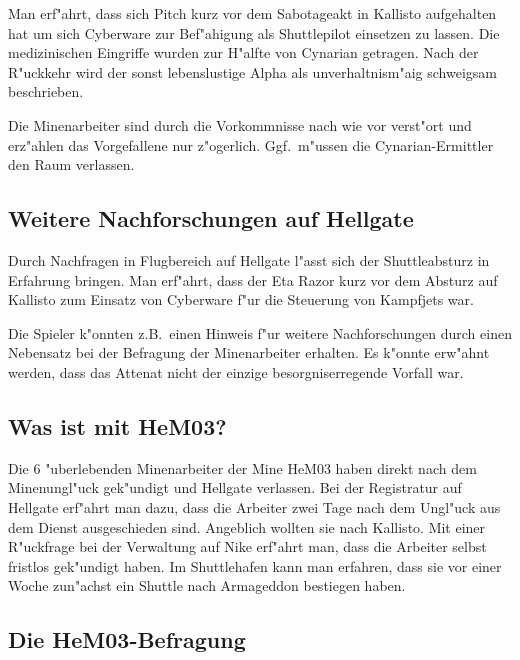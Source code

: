 Man erf"ahrt, dass sich Pitch kurz vor dem Sabotageakt in Kallisto aufgehalten hat um sich Cyberware zur Bef"ahigung als Shuttlepilot einsetzen zu lassen. Die medizinischen Eingriffe wurden zur H"alfte von Cynarian getragen. Nach der R"uckkehr wird der sonst lebenslustige Alpha als unverhaltnism"a\3ig schweigsam beschrieben.

\begin{remarks}
Die Minenarbeiter sind durch die Vorkommnisse nach wie vor verst"ort und erz"ahlen das Vorgefallene nur z"ogerlich. Ggf.~m"ussen die Cynarian-Ermittler den Raum verlassen.
\end{remarks}

\subsection{Weitere Nachforschungen auf Hellgate}

Durch Nachfragen in Flugbereich auf Hellgate l"asst sich der Shuttleabsturz in Erfahrung bringen. Man erf"ahrt, dass der Eta Razor kurz vor dem Absturz auf Kallisto zum Einsatz von Cyberware f"ur die Steuerung von Kampfjets war.

\begin{remarks}
Die Spieler k"onnten z.B.~einen Hinweis f"ur weitere Nachforschungen durch einen Nebensatz bei der Befragung der Minenarbeiter erhalten. Es k"onnte erw"ahnt werden, dass das Attenat nicht der einzige besorgniserregende Vorfall war.
\end{remarks}

\subsection{Was ist mit HeM03?}

Die 6 "uberlebenden Minenarbeiter der Mine HeM03 haben direkt nach dem Minenungl"uck gek"undigt und Hellgate verlassen. Bei der Registratur auf Hellgate erf"ahrt man dazu, dass die Arbeiter zwei Tage nach dem Ungl"uck aus dem Dienst ausgeschieden sind. Angeblich wollten sie nach Kallisto. Mit einer R"uckfrage bei der Verwaltung auf
Nike erf"ahrt man, dass die Arbeiter selbst fristlos gek"undigt haben. Im Shuttlehafen kann man erfahren, dass sie vor einer Woche zun"achst ein Shuttle nach Armageddon bestiegen haben.

\subsection{Die HeM03-Befragung}

